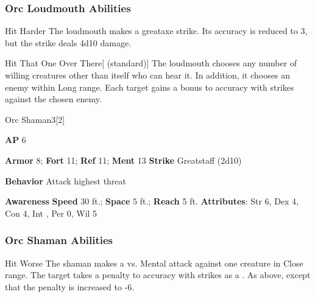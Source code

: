 \subsubsection{Orc Loudmouth Abilities}

\begin{freeability}{Hit Harder}
The loudmouth makes a greataxe strike.
Its accuracy is reduced to 3, but the strike deals 4d10 damage.
\end{freeability}

\vspace{0.5em}
\begin{freeability}{Hit That One Over There}[ (standard)]
The loudmouth chooses any number of willing creatures other than itself who can hear it.
In addition, it chooses an enemy within Long range.
Each target gains a  bonus to accuracy with strikes against the chosen enemy.
\end{freeability}

\begin{monsection}{Orc Shaman}{3}[2]
\vspace{-1em}\vspace{-1em}
\begin{spellcontent}
\begin{spelltargetinginfo}
{\textbf{AP} 6}

\pari \textbf{Armor} 8;
\textbf{Fort} 11;
\textbf{Ref} 11;
\textbf{Ment} 13
\pari \textbf{Strike} Greatstaff  (2d10)



\pari \textbf{Behavior} Attack highest threat
\end{spelltargetinginfo}
\end{spellcontent}

\begin{monsterfooter}
\pari \textbf{Awareness} 
\pari \textbf{Speed} 30 ft.;
\textbf{Space} 5 ft.;
\textbf{Reach} 5 ft.
\pari \textbf{Attributes}:
Str 6,
Dex 4,
Con 4,
Int ,
Per 0,
Wil 5
\end{monsterfooter}
\end{monsection}


\subsubsection{Orc Shaman Abilities}

\begin{freeability}{Hit Worse}
The shaman makes a  vs. Mental attack against one creature in Close range.
\hit The target takes a  penalty to accuracy with strikes as a .
\crit As above, except that the penalty is increased to -6.
\end{freeability}

